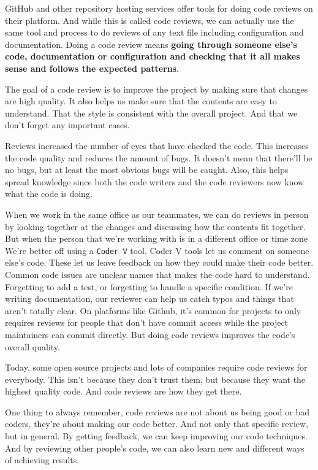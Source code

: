 	GitHub and other repository hosting services offer tools for doing code reviews on their platform. And while this is called code reviews, we can actually use the same tool and process to do reviews of any text file including configuration and documentation. Doing a code review means \textbf{going through someone else's code, documentation or configuration and checking that it all makes sense and follows the expected patterns}.
	
	The goal of a code review is to improve the project by making sure that changes are high quality. It also helps us make sure that the contents are easy to understand. That the style is consistent with the overall project. And that we don't forget any important cases. 
	
	Reviews increased the number of eyes that have checked the code. This increases the code quality and reduces the amount of bugs. It doesn't mean that there'll be no bugs, but at least the most obvious bugs will be caught. Also, this helps spread knowledge since both the code writers and the code reviewers now know what the code is doing. 
	
	When we work in the same office as our teammates, we can do reviews in person by looking together at the changes and discussing how the contents fit together. But when the person that we're working with is in a different office or time zone We're better off using a \texttt{Coder V} tool. Coder V tools let us comment on someone else's code. These let us leave feedback on how they could make their code better. Common code issues are unclear names that makes the code hard to understand. Forgetting to add a test, or forgetting to handle a specific condition. If we're writing documentation, our reviewer can help us catch typos and things that aren't totally clear. On platforms like Github, it's common for projects to only requires reviews for people that don't have commit access while the project maintainers can commit directly. But doing code reviews improves the code's overall quality. 
	
	Today, some open source projects and lots of companies require code reviews for everybody. This isn't because they don't trust them, but because they want the highest quality code. And code reviews are how they get there. 
	
	One thing to always remember, code reviews are not about us being good or bad coders, they're about making our code better. And not only that specific review, but in general. By getting feedback, we can keep improving our code techniques. And by reviewing other people's code, we can also learn new and different ways of achieving results. 
	
